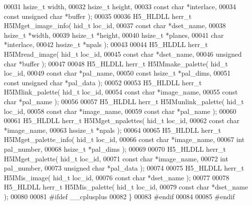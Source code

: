 \begin{DoxyCode}
00031                              hsize\_t width,
00032                              hsize\_t height,
00033                              \textcolor{keyword}{const} \textcolor{keywordtype}{char} *interlace,
00034                              \textcolor{keyword}{const} \textcolor{keywordtype}{unsigned} \textcolor{keywordtype}{char} *buffer );
00035 
00036 H5\_HLDLL herr\_t  H5IMget\_image\_info( hid\_t loc\_id,
00037                      \textcolor{keyword}{const} \textcolor{keywordtype}{char} *dset\_name,
00038                      hsize\_t *width,
00039                      hsize\_t *height,
00040                      hsize\_t *planes,
00041                      \textcolor{keywordtype}{char}    *interlace,
00042                      hssize\_t *npals );
00043 
00044 H5\_HLDLL herr\_t  H5IMread\_image( hid\_t loc\_id,
00045                        \textcolor{keyword}{const} \textcolor{keywordtype}{char} *dset\_name,
00046                        \textcolor{keywordtype}{unsigned} \textcolor{keywordtype}{char} *buffer );
00047 
00048 H5\_HLDLL herr\_t  H5IMmake\_palette( hid\_t loc\_id,
00049                          \textcolor{keyword}{const} \textcolor{keywordtype}{char} *pal\_name,
00050                          \textcolor{keyword}{const} hsize\_t *pal\_dims,
00051                          \textcolor{keyword}{const} \textcolor{keywordtype}{unsigned} \textcolor{keywordtype}{char} *pal\_data );
00052 
00053 H5\_HLDLL herr\_t  H5IMlink\_palette( hid\_t loc\_id,
00054                         \textcolor{keyword}{const} \textcolor{keywordtype}{char} *image\_name,
00055                         \textcolor{keyword}{const} \textcolor{keywordtype}{char} *pal\_name );
00056 
00057 H5\_HLDLL herr\_t  H5IMunlink\_palette( hid\_t loc\_id,
00058                            \textcolor{keyword}{const} \textcolor{keywordtype}{char} *image\_name,
00059                            \textcolor{keyword}{const} \textcolor{keywordtype}{char} *pal\_name );
00060 
00061 H5\_HLDLL herr\_t  H5IMget\_npalettes( hid\_t loc\_id,
00062                           \textcolor{keyword}{const} \textcolor{keywordtype}{char} *image\_name,
00063                           hssize\_t *npals );
00064 
00065 H5\_HLDLL herr\_t  H5IMget\_palette\_info( hid\_t loc\_id,
00066                         \textcolor{keyword}{const} \textcolor{keywordtype}{char} *image\_name,
00067                         \textcolor{keywordtype}{int} pal\_number,
00068                         hsize\_t *pal\_dims );
00069 
00070 H5\_HLDLL herr\_t  H5IMget\_palette( hid\_t loc\_id,
00071                         \textcolor{keyword}{const} \textcolor{keywordtype}{char} *image\_name,
00072                         \textcolor{keywordtype}{int} pal\_number,
00073                         \textcolor{keywordtype}{unsigned} \textcolor{keywordtype}{char} *pal\_data );
00074 
00075 H5\_HLDLL herr\_t  H5IMis\_image( hid\_t loc\_id,
00076                      \textcolor{keyword}{const} \textcolor{keywordtype}{char} *dset\_name );
00077 
00078 H5\_HLDLL herr\_t  H5IMis\_palette( hid\_t loc\_id,
00079                      \textcolor{keyword}{const} \textcolor{keywordtype}{char} *dset\_name );
00080 
00081 \textcolor{preprocessor}{#ifdef \_\_cplusplus}
00082 \}
00083 \textcolor{preprocessor}{#endif}
00084 
00085 \textcolor{preprocessor}{#endif}
\end{DoxyCode}
